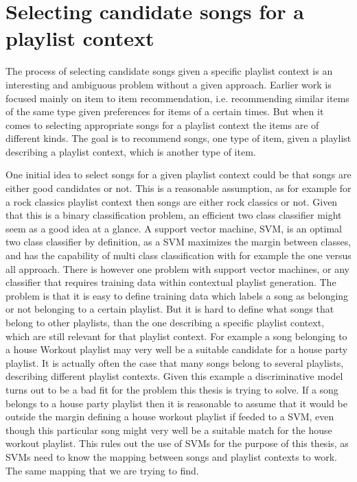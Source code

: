\documentclass[a4paper,11pt]{kth-mag}
\begin{document}
\section{Selecting candidate songs for a playlist context}
The process of selecting candidate songs given a specific playlist context is an interesting and ambiguous problem without a given approach. Earlier work is focused mainly on item to item recommendation, i.e. recommending similar items of the same type given preferences for items of a certain times. But when it comes to selecting appropriate songs for a playlist context the items are of different kinds. The goal is to recommend songs, one type of item, given a playlist describing a playlist context, which is another type of item. 

One initial idea to select songs for a given playlist context could be that songs are either good candidates or not. This is a reasonable assumption, as for example for a rock classics playlist context then songs are either rock classics or not. Given that this is a binary classification problem, an efficient two class classifier might seem as a good idea at a glance. A support vector machine, SVM,  is an optimal two class classifier by definition, as a SVM maximizes the margin between classes\cite{cortes1995support}, and has the capability of multi class classification with for example the one versus all approach\cite{hsu2002comparison}. There is however one problem with support vector machines, or any classifier that requires training data within contextual playlist generation. The problem is that it is easy to define training data which labels a song as belonging or not belonging to a certain playlist. But it is hard to define what songs that belong to other playlists, than the one describing a specific playlist context, which are still relevant for that playlist context. For example a song belonging to a house Workout playlist may very well be a suitable candidate for a house party playlist. It is actually often the case that many songs belong to several playlists, describing different playlist contexts. Given this example a discriminative model turns out to be a bad fit for the problem this thesis is trying to solve. If a song belongs to a house party playlist then it is reasonable to assume that it would be outside the margin defining a house workout playlist if feeded to a SVM, even though this particular song might very well be a suitable match for the house workout playlist. This rules out the use of SVMs for the purpose of this thesis, as SVMs need to know the mapping between songs and playlist contexts to work. The same mapping that we are trying to find.
\end{document}
